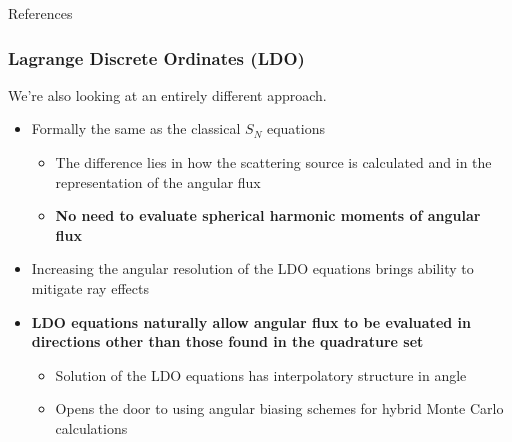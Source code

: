 \documentclass[xcolor=x11names,compress]{beamer}
\renewcommand{\(}{\begin{columns}}
\renewcommand{\)}{\end{columns}}
\newcommand{\<}[1]{\begin{column}{#1}}
\renewcommand{\>}{\end{column}}
\begin{document}
\begin{frame}{References}
\small
        
\end{frame}

%	
%	




\begin{frame}[fragile]

  \frametitle{Lagrange Discrete Ordinates (LDO) \cite{Ahrens2015}}

   We're also looking at an entirely different approach.    
\pause
\begin{itemize}
\item{Formally the same as the classical $S_N$ equations}
	\begin{itemize}
	\pause
	\item{The difference lies in how the scattering source is calculated and in the representation of the angular flux}
	\pause
	\item{\textbf{No need to evaluate spherical harmonic moments of angular flux}}
	\end{itemize}
\pause
\item{Increasing the angular resolution of the LDO equations brings ability to mitigate ray effects}
\pause
\item{\textbf{LDO equations naturally allow angular flux to be evaluated in directions other than those found in the quadrature set}}
	\begin{itemize}
	\pause
	\item{Solution of the LDO equations has interpolatory structure in angle}
	\pause
	\item{Opens the door to using angular biasing schemes for hybrid Monte Carlo calculations}
	\end{itemize}
\end{itemize}

\end{frame}
\end{document}
